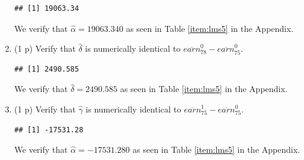 \documentclass[
]{article}
\newenvironment{Shaded}{\begin{snugshade}}{\end{snugshade}}
\newcommand{\FunctionTok}[1]{\textcolor[rgb]{0.13,0.29,0.53}{\textbf{#1}}}
\newcommand{\NormalTok}[1]{#1}
\newcommand{\SpecialCharTok}[1]{\textcolor[rgb]{0.81,0.36,0.00}{\textbf{#1}}}
\begin{document}
\begin{enumerate}
\begin{Shaded}
\end{Shaded}

\begin{verbatim}
## [1] 19063.34
\end{verbatim}

  We verify that \(\hat{\alpha} = 19063.340\) as seen in Table
  \ref{item:lms5} in the Appendix.
\item
  (1 p) Verify that \(\hat{\delta}\) is numerically identical to
  \(\overline{earn}_{78}^{0}-\overline{earn}_{75}^{0}\).

\begin{Shaded}
\end{Shaded}

\begin{verbatim}
## [1] 2490.585
\end{verbatim}

  We verify that \(\hat{\delta} = 2490.585\) as seen in Table
  \ref{item:lms5} in the Appendix.
\item
  (1 p) Verify that \(\hat{\gamma}\) is numerically identical to
  \(\overline{earn}_{75}^{1}-\overline{earn}_{75}^{0}\).

\begin{Shaded}
\end{Shaded}

\begin{verbatim}
## [1] -17531.28
\end{verbatim}

  We verify that \(\hat{\alpha} = -17531.280\) as seen in Table
  \ref{item:lms5} in the Appendix.
\end{enumerate}
\end{document}
